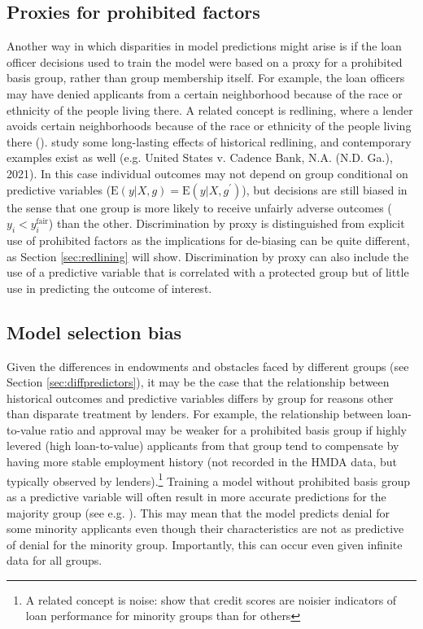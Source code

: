 \subsection{Proxies for prohibited factors}\label{sec:proxy}
Another way in which disparities in model predictions might arise is if the loan officer decisions used to train the model were based on a proxy for a prohibited basis group, rather than group membership itself. For example, the loan officers may have denied applicants from a certain neighborhood because of the race or ethnicity of the people living there. A related concept is redlining, where a lender avoids certain neighborhoods because of the race or ethnicity of the people living there ().  study some long-lasting effects of historical redlining, and contemporary examples exist as well (e.g. United States v. Cadence Bank, N.A. (N.D. Ga.), 2021). In this case individual outcomes may not depend on group conditional on predictive variables ($\text{E}\left(y\vert X,g\right)=\text{E}\left(y\vert X,g^\prime\right)$), but decisions are still biased in the sense that one group is more likely to receive unfairly adverse outcomes ($y_i<y^\text{fair}_i$) than the other. Discrimination by proxy is distinguished from explicit use of prohibited factors as the implications for de-biasing can be quite different, as Section \ref{sec:redlining} will show. Discrimination by proxy can also include the use of a predictive variable that is correlated with a protected group but of little use in predicting the outcome of interest.  

\subsection{Model selection bias}\label{sec:modelselect}
Given the differences in endowments and obstacles faced by different groups (see Section \ref{sec:diffpredictors}), it may be the case that the relationship between historical outcomes and predictive variables differs by group for reasons other than disparate treatment by lenders. For example, the relationship between loan-to-value ratio and approval may be weaker for a prohibited basis group if highly levered (high loan-to-value) applicants from that group tend to compensate by having more stable employment history (not recorded in the HMDA data, but typically observed by lenders).\footnote{A related concept is noise:  show that credit scores are noisier indicators of loan performance for minority groups than for others} Training a model without prohibited basis group as a predictive variable will often result in more accurate predictions for the majority group (see e.g. ). This may mean that the model predicts denial for some minority applicants even though their characteristics are not as predictive of denial for the minority group. Importantly, this can occur even given infinite data for all groups.

